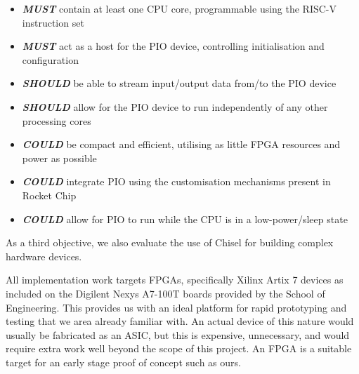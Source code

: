 \begin{itemize}
    \item \textit{\textbf{MUST}} contain at least one CPU core, programmable using the RISC-V instruction set
    \item \textit{\textbf{MUST}} act as a host for the PIO device, controlling initialisation and configuration
    \item \textit{\textbf{SHOULD}} be able to stream input/output data from/to the PIO device
    \item \textit{\textbf{SHOULD}} allow for the PIO device to run independently of any other processing cores
    \item \textit{\textbf{COULD}} be compact and efficient, utilising as little FPGA resources and power as possible
    \item \textit{\textbf{COULD}} integrate PIO using the customisation mechanisms present in Rocket Chip
    \item \textit{\textbf{COULD}} allow for PIO to run while the CPU is in a low-power/sleep state
\end{itemize}

As a third objective, we also evaluate the use of Chisel for building complex hardware devices.

All implementation work targets FPGAs, specifically Xilinx Artix 7 devices as included on the Digilent Nexys A7-100T boards provided by the School of Engineering. This provides us with an ideal platform for rapid prototyping and testing that we area already familiar with. An actual device of this nature would usually be fabricated as an ASIC, but this is expensive, unnecessary, and would require extra work well beyond the scope of this project. An FPGA is a suitable target for an early stage proof of concept such as ours.
